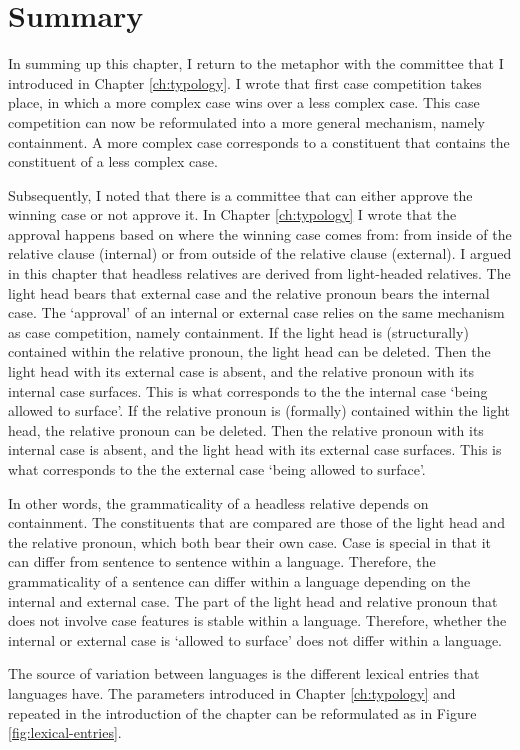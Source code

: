 \section{Summary}

In summing up this chapter, I return to the metaphor with the committee that I introduced in Chapter \ref{ch:typology}. I wrote that first case competition takes place, in which a more complex case wins over a less complex case. This case competition can now be reformulated into a more general mechanism, namely containment. A more complex case corresponds to a constituent that contains the constituent of a less complex case.

Subsequently, I noted that there is a committee that can either approve the winning case or not approve it. In Chapter \ref{ch:typology} I wrote that the approval happens based on where the winning case comes from: from inside of the relative clause (internal) or from outside of the relative clause (external). I argued in this chapter that headless relatives are derived from light-headed relatives. The light head bears that external case and the relative pronoun bears the internal case. The `approval' of an internal or external case relies on the same mechanism as case competition, namely containment.
If the light head is (structurally) contained within the relative pronoun, the light head can be deleted. Then the light head with its external case is absent, and the relative pronoun with its internal case surfaces. This is what corresponds to the the internal case `being allowed to surface'.
If the relative pronoun is (formally) contained within the light head, the relative pronoun can be deleted. Then the relative pronoun with its internal case is absent, and the light head with its external case surfaces. This is what corresponds to the the external case `being allowed to surface'.

In other words, the grammaticality of a headless relative depends on containment. The constituents that are compared are those of the light head and the relative pronoun, which both bear their own case. Case is special in that it can differ from sentence to sentence within a language. Therefore, the grammaticality of a sentence can differ within a language depending on the internal and external case. The part of the light head and relative pronoun that does not involve case features is stable within a language. Therefore, whether the internal or external case is `allowed to surface' does not differ within a language.

The source of variation between languages is the different lexical entries that languages have. The parameters introduced in Chapter \ref{ch:typology} and repeated in the introduction of the chapter can be reformulated as in Figure \ref{fig:lexical-entries}.

